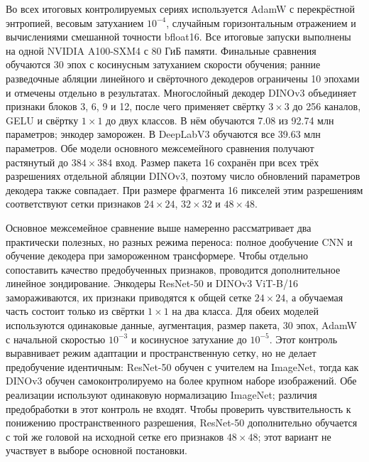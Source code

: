 \documentclass[a4paper,12pt]{extarticle}
\begin{document}
Во всех итоговых контролируемых сериях используется AdamW с перекрёстной энтропией,
весовым затуханием $10^{-4}$, случайным горизонтальным отражением и вычислениями
смешанной точности bfloat16. Все итоговые запуски выполнены на одной NVIDIA
A100-SXM4 с 80 ГиБ памяти. Финальные сравнения обучаются 30 эпох с косинусным
затуханием скорости обучения; ранние разведочные абляции линейного и
свёрточного декодеров ограничены 10 эпохами и отмечены отдельно в результатах.
Многослойный декодер DINOv3 объединяет признаки блоков 3,
6, 9 и 12, после чего применяет свёртку $3\times3$ до 256 каналов, GELU и
свёртку $1\times1$ до двух классов. В нём обучаются 7.08 из 92.74 млн
параметров; энкодер заморожен. В DeepLabV3 обучаются все 39.63 млн параметров.
Обе модели основного межсемейного сравнения получают растянутый до
$384\times384$ вход. Размер пакета 16 сохранён при всех трёх разрешениях
отдельной абляции DINOv3, поэтому число обновлений
параметров декодера также совпадает. При размере фрагмента 16 пикселей этим
разрешениям соответствуют сетки признаков $24\times24$, $32\times32$ и
$48\times48$.

Основное межсемейное сравнение выше намеренно рассматривает два практически
полезных, но разных режима переноса: полное дообучение CNN и обучение декодера
при замороженном трансформере. Чтобы отдельно сопоставить качество
предобученных признаков, проводится дополнительное линейное зондирование.
Энкодеры ResNet-50 и DINOv3 ViT-B/16 замораживаются, их признаки приводятся к
общей сетке $24\times24$, а обучаемая часть состоит только из свёртки
$1\times1$ на два класса. Для обеих моделей используются одинаковые данные,
аугментация, размер пакета, 30 эпох, AdamW с начальной скоростью $10^{-3}$ и
косинусное затухание до $10^{-5}$. Этот контроль выравнивает режим адаптации и
пространственную сетку, но не делает предобучение идентичным: ResNet-50 обучен
с учителем на ImageNet, тогда как DINOv3 обучен самоконтролируемо на более
крупном наборе изображений. Обе реализации используют одинаковую нормализацию
ImageNet; различия предобработки в этот контроль не входят.
Чтобы проверить чувствительность к понижению пространственного разрешения,
ResNet-50 дополнительно обучается с той же головой на исходной сетке его
признаков $48\times48$; этот вариант не участвует в выборе основной постановки.
\end{document}
